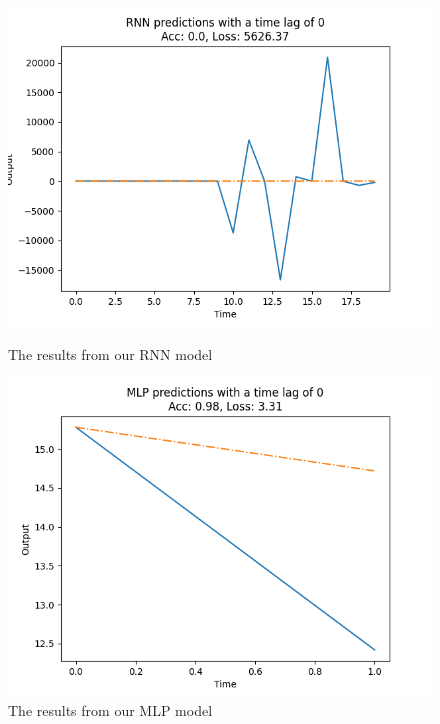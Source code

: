 \documentclass{article}
\begin{document}
    \begin{figure}[H]
        \begin{minipage}{0.49\textwidth}
            \centering
            \includegraphics[width=\linewidth]{../../img/rnnEval}
            \caption{The results from our RNN model}\label{Fig:rnnEval}
        \end{minipage}\hfill
        \begin{minipage}{0.49\textwidth}
            \centering
            \includegraphics[width=\linewidth]{../../img/mlpEval}
            \caption{The results from our MLP model}\label{Fig:mlpEval}
        \end{minipage}
    \end{figure}
\end{document}
